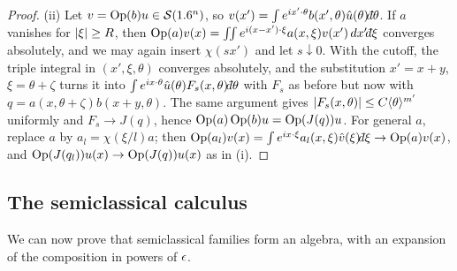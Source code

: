 \begin{proof}
  (ii) Let $v=\operatorname{Op}(b)u\in\mathcal{S}(1.6^n)$, so
  $v(x')=\int e^{ix'\cdot\theta}b(x',\theta)\hat u(\theta)\dbar\theta$. If $a$
  vanishes for $\lvert \xi\rvert\ge R$, then
  $\Op(a)v(x)=\int\!\!\int e^{i(x-x')\cdot\xi}a(x,\xi)v(x')\,dx'\dbar\xi$ converges absolutely,
  and we may again insert $\chi(sx')$ and let $s\downarrow0$. With the cutoff, the
  triple integral in $(x',\xi,\theta)$ converges absolutely, and the substitution
  $x'=x+y$, $\xi=\theta+\zeta$ turns it into
  $\int e^{ix\cdot\theta}\hat u(\theta)F_s(x,\theta)\dbar\theta$ with $F_s$ as before
  but now with $q=a(x,\theta+\zeta)b(x+y,\theta)$. The same argument gives
  $\lvert F_s(x,\theta)\rvert\le C\langle \theta\rangle^{m'}$ uniformly and $F_s\to J(q)$, hence
  $\operatorname{Op}(a)\operatorname{Op}(b)u=\operatorname{Op}(J(q))u$. For general $a$, replace $a$ by $a_l=\chi(\xi/l)a$;
  then $\Op(a_l)v(x)=\int e^{ix\cdot\xi}a_l(x,\xi)\hat v(\xi)\dbar\xi\to\Op(a)v(x)$,
  and $\operatorname{Op}(J(q_l))u(x)\to\operatorname{Op}(J(q))u(x)$ as in (i).
\end{proof}

\subsection{The semiclassical calculus}
We can now prove that semiclassical families form an algebra, with an
expansion of the composition in powers of $\epsilon$.

